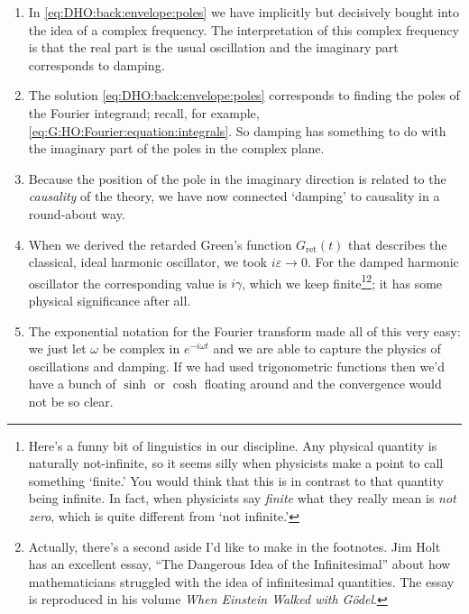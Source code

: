 \documentclass[
  11pt,
	colorful,
	raggedright,
]{tufte-style-thesis-flip}
\begin{document}
 \begin{enumerate}
 \item In \eqref{eq:DHO:back:envelope:poles} we have implicitly but decisively bought into the idea of a complex frequency. The interpretation of this complex frequency is that the real part is the usual oscillation and the imaginary part corresponds to damping.

 \item The solution \eqref{eq:DHO:back:envelope:poles} corresponds to finding the poles of the Fourier integrand; recall, for example, \eqref{eq:G:HO:Fourier:equation:integrals}. So damping has something to do with the imaginary part of the poles in the complex plane.

 \item Because the position of the pole in the imaginary direction is related to the \emph{causality} of the theory, we have now connected `damping' to causality in a round-about way.

 \item When we derived the retarded Green's function $G_\text{ret}(t)$ that describes the classical, ideal harmonic oscillator, we took $i\varepsilon\to 0$. For the damped harmonic oscillator the corresponding value is $i\gamma$, which we keep finite\footnote{Here's a funny bit of linguistics in our discipline. Any physical quantity is naturally not-infinite, so it seems silly when physicists make a point to call something `finite.' You would think that this is in contrast to that quantity being infinite. In fact, when physicists say \emph{finite} what they really mean is \emph{not zero}, which is quite different from `not infinite.'}\footnote{Actually, there's a second aside I'd like to make in the footnotes. Jim Holt has an excellent essay, ``The Dangerous Idea of the Infinitesimal'' about how mathematicians struggled with the idea of infinitesimal quantities. The essay is reproduced in his volume \emph{When Einstein Walked with G\"odel}.}; it has some physical significance after all.

 \item The exponential notation for the Fourier transform made all of this very easy: we just let $\omega$ be complex in $e^{-i\omega t}$ and we are able to capture the physics of oscillations and damping. If we had used trigonometric functions then we'd have a bunch of $\sinh$ or $\cosh$ floating around and the convergence would not be so clear.
 \end{enumerate}
 
\end{document}
